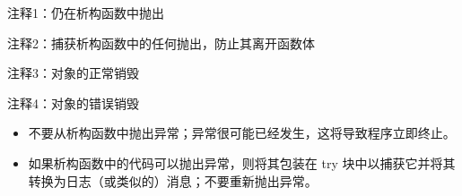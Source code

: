 {\footnotesize
注释1：仍在析构函数中抛出

注释2：捕获析构函数中的任何抛出，防止其离开函数体

注释3：对象的正常销毁

注释4：对象的错误销毁
}


\begin{itemize}
\item
不要从析构函数中抛出异常；异常很可能已经发生，这将导致程序立即终止。

\item
如果析构函数中的代码可以抛出异常，则将其包装在 try 块中以捕获它并将其转换为日志（或类似的）消息；不要重新抛出异常。
\end{itemize}
























